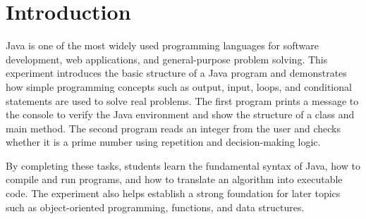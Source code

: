 \section{Introduction}
Java is one of the most widely used programming languages for software development, web applications, and general-purpose problem solving. This experiment introduces the basic structure of a Java program and demonstrates how simple programming concepts such as output, input, loops, and conditional statements are used to solve real problems. The first program prints a message to the console to verify the Java environment and show the structure of a class and main method. The second program reads an integer from the user and checks whether it is a prime number using repetition and decision-making logic.

By completing these tasks, students learn the fundamental syntax of Java, how to compile and run programs, and how to translate an algorithm into executable code. The experiment also helps establish a strong foundation for later topics such as object-oriented programming, functions, and data structures.
